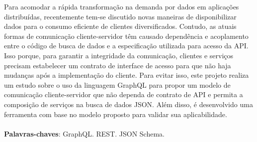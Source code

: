 \begin{resumo}
  Para acomodar a rápida transformação na demanda por dados em aplicações distribuídas, recentemente tem-se discutido novas maneiras de disponibilizar dados para o consumo eficiente de clientes diversificados. Contudo, as atuais formas de comunicação cliente-servidor têm causado dependência e acoplamento entre o código de busca de dados e a especificação utilizada para acesso da API. Isso porque, para garantir a integridade da comunicação, clientes e serviços precisam estabelecer um contrato de interface de acesso para que não haja mudanças após a implementação do cliente. Para evitar isso, este projeto realiza um estudo sobre o uso da linguagem GraphQL para propor um modelo de comunicação cliente-servidor que não dependa de contrato de API e permita a composição de serviços na busca de dados JSON. Além disso, é desenvolvido uma ferramenta com base no modelo proposto para validar sua aplicabilidade. \\ \\
  \textbf{Palavras-chaves}: GraphQL. REST. JSON Schema.
\end{resumo}